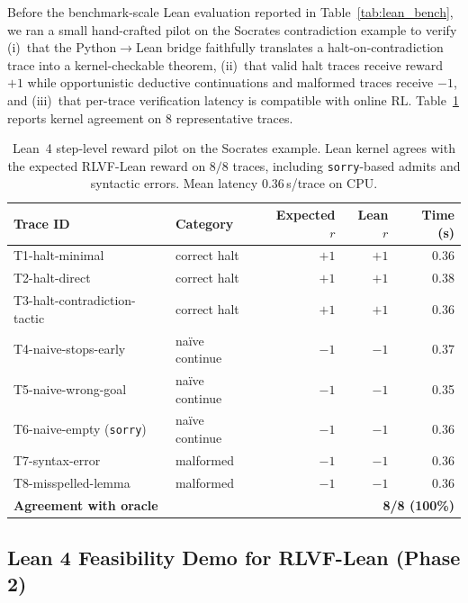 \documentclass{article}
\begin{document}
\label{app:lean-pilot}

Before the benchmark-scale Lean evaluation reported in Table~\ref{tab:lean_bench}, we ran a small hand-crafted pilot on the Socrates contradiction example to verify (i)~that the Python$\to$Lean bridge faithfully translates a halt-on-contradiction trace into a kernel-checkable theorem, (ii)~that valid halt traces receive reward~$+1$ while opportunistic deductive continuations and malformed traces receive $-1$, and (iii)~that per-trace verification latency is compatible with online RL. Table~\ref{tab:lean_pilot} reports kernel agreement on $8$ representative traces.

\begin{table}[h]
\centering\small
\caption{Lean~4 step-level reward pilot on the Socrates example. Lean kernel agrees with the expected RLVF-Lean reward on $8/8$ traces, including \texttt{sorry}-based admits and syntactic errors. Mean latency $0.36$\,s/trace on CPU.}
\label{tab:lean_pilot}
\begin{tabular}{llrrr}
\toprule
\textbf{Trace ID} & \textbf{Category} & \textbf{Expected $r$} & \textbf{Lean $r$} & \textbf{Time (s)} \\
\midrule
T1-halt-minimal              & correct halt       & $+1$ & $+1$ & 0.36 \\
T2-halt-direct               & correct halt       & $+1$ & $+1$ & 0.38 \\
T3-halt-contradiction-tactic & correct halt       & $+1$ & $+1$ & 0.36 \\
T4-naive-stops-early         & na\"ive continue   & $-1$ & $-1$ & 0.37 \\
T5-naive-wrong-goal          & na\"ive continue   & $-1$ & $-1$ & 0.35 \\
T6-naive-empty (\texttt{sorry}) & na\"ive continue & $-1$ & $-1$ & 0.36 \\
T7-syntax-error              & malformed          & $-1$ & $-1$ & 0.36 \\
T8-misspelled-lemma          & malformed          & $-1$ & $-1$ & 0.36 \\
\midrule
\multicolumn{2}{l}{\textbf{Agreement with oracle}} & \multicolumn{3}{r}{\textbf{8/8 (100\%)}} \\
\bottomrule
\end{tabular}
\end{table}

\subsection{Lean 4 Feasibility Demo for RLVF-Lean (Phase 2)}
\label{app:lean-demo}
\end{document}
